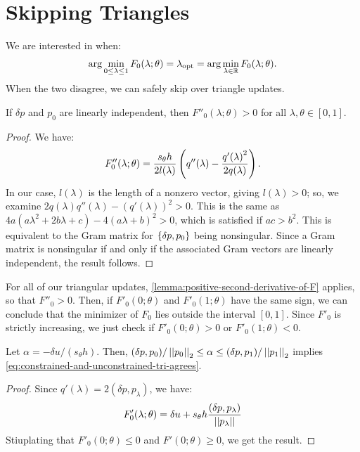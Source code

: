 \documentclass[eikonal.tex]{subfiles}
\begin{document}
\section{Skipping Triangles}

We are interested in when:
\begin{align}\label{eq:constrained-and-unconstrained-tri-agrees}
  \arg\min_{0 \leq \lambda \leq 1} F_0(\lambda; \theta) = \lambda_{\operatorname{opt}} = \arg\min_{\lambda \in \mathbb{R}} F_0(\lambda; \theta).
\end{align}
When the two disagree, we can safely skip over triangle updates.

\begin{lemma}\label{lemma:positive-second-derivative-of-F}
  If $\delta p$ and $p_0$ are linearly independent, then
  $F''_0(\lambda; \theta) > 0$ for all $\lambda, \theta \in [0, 1]$.
\end{lemma}

\begin{proof}
  We have:
  \begin{align*}
    F_0''(\lambda; \theta) = \frac{s_{\theta}h}{2 l(\lambda)} \left(q''(\lambda) - \frac{{q'(\lambda)}^2}{2q(\lambda)}\right).
  \end{align*}
  In our case, $l(\lambda)$ is the length of a nonzero vector, giving
  $l(\lambda) > 0$; so, we examine
  $2q(\lambda)q''(\lambda) - {(q'(\lambda))}^2 > 0$. This is the same
  as $4a(a\lambda^2 + 2b\lambda + c) - 4(a\lambda + b)^2 > 0$, which
  is satisfied if $ac > b^2$. This is equivalent to the Gram matrix
  for $\left\{\delta p, p_0\right\}$ being nonsingular. Since a Gram matrix is
  nonsingular if and only if the associated Gram vectors are linearly
  independent, the result follows.
\end{proof}

For all of our triangular updates,
\cref{lemma:positive-second-derivative-of-F} applies, so that
$F''_0 > 0$. Then, if $F'_0(0; \theta)$ and $F'_0(1; \theta)$ have the
same sign, we can conclude that the minimizer of $F_0$ lies outside
the interval $[0, 1]$. Since $F'_0$ is strictly increasing, we just
check if $F'_0(0; \theta) > 0$ or $F'_0(1; \theta) < 0$.

\begin{lemma}
  Let $\alpha = -\delta u/(s_\theta h)$. Then,
  $(\delta p, p_0)/\left|\left|p_0\right|\right|_2 \leq \alpha \leq (\delta p,
  p_1)/\left|\left|p_1\right|\right|_2$ implies
  \cref{eq:constrained-and-unconstrained-tri-agrees}.
\end{lemma}

\begin{proof}
  Since $q'(\lambda) = 2(\delta p, p_\lambda)$, we have:
  \begin{align*}
    F_0'(\lambda; \theta) = \delta u + s_\theta h \frac{(\delta p, p_\lambda)}{\left|\left|p_\lambda\right|\right|}
  \end{align*}
  Stiuplating that $F'_0(0; \theta) \leq 0$ and
  $F'(0; \theta) \geq 0$, we get the result.
\end{proof}
\end{document}
